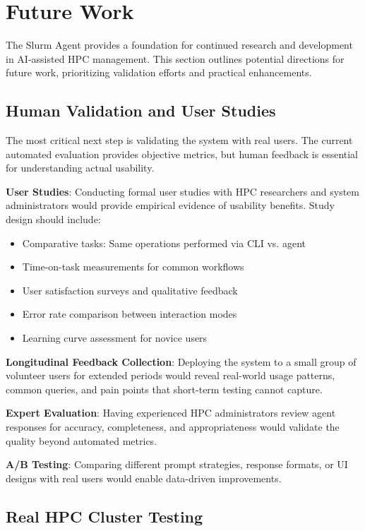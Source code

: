 \section{Future Work}
\label{sec:future-work}

The Slurm Agent provides a foundation for continued research and development in AI-assisted HPC management. This section outlines potential directions for future work, prioritizing validation efforts and practical enhancements.

\subsection{Human Validation and User Studies}

The most critical next step is validating the system with real users. The current automated evaluation provides objective metrics, but human feedback is essential for understanding actual usability.

\textbf{User Studies}: Conducting formal user studies with HPC researchers and system administrators would provide empirical evidence of usability benefits. Study design should include:
\begin{itemize}
    \item Comparative tasks: Same operations performed via CLI vs. agent
    \item Time-on-task measurements for common workflows
    \item User satisfaction surveys and qualitative feedback
    \item Error rate comparison between interaction modes
    \item Learning curve assessment for novice users
\end{itemize}

\textbf{Longitudinal Feedback Collection}: Deploying the system to a small group of volunteer users for extended periods would reveal real-world usage patterns, common queries, and pain points that short-term testing cannot capture.

\textbf{Expert Evaluation}: Having experienced HPC administrators review agent responses for accuracy, completeness, and appropriateness would validate the quality beyond automated metrics.

\textbf{A/B Testing}: Comparing different prompt strategies, response formats, or UI designs with real users would enable data-driven improvements.

\subsection{Real HPC Cluster Testing}

